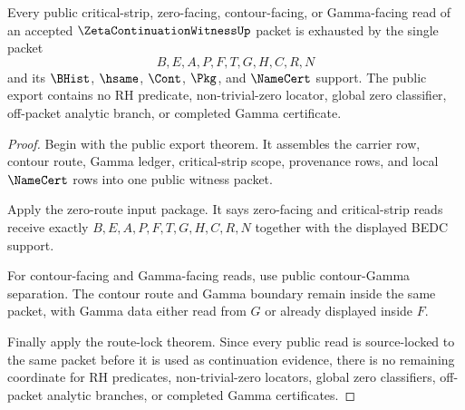 \begin{theorem}
\label{thm:zeta-continuation-witness-public-export-totality}
Every public critical-strip, zero-facing, contour-facing, or Gamma-facing read of an accepted $\ZetaContinuationWitnessUp$ packet is exhausted by the single packet
$$
B,E,A,P,F,T,G,H,C,R,N
$$
and its $\BHist$, $\hsame$, $\Cont$, $\Pkg$, and $\NameCert$ support. The public export contains no RH predicate, non-trivial-zero locator, global zero classifier, off-packet analytic branch, or completed Gamma certificate.
\end{theorem}
\begin{proof}
Begin with the public export theorem. It assembles the carrier row, contour route, Gamma ledger, critical-strip scope, provenance rows, and local $\NameCert$ rows into one public witness packet.

Apply the zero-route input package. It says zero-facing and critical-strip reads receive exactly $B,E,A,P,F,T,G,H,C,R,N$ together with the displayed BEDC support.

For contour-facing and Gamma-facing reads, use public contour-Gamma separation. The contour route and Gamma boundary remain inside the same packet, with Gamma data either read from $G$ or already displayed inside $F$.

Finally apply the route-lock theorem. Since every public read is source-locked to the same packet before it is used as continuation evidence, there is no remaining coordinate for RH predicates, non-trivial-zero locators, global zero classifiers, off-packet analytic branches, or completed Gamma certificates.
\end{proof}
